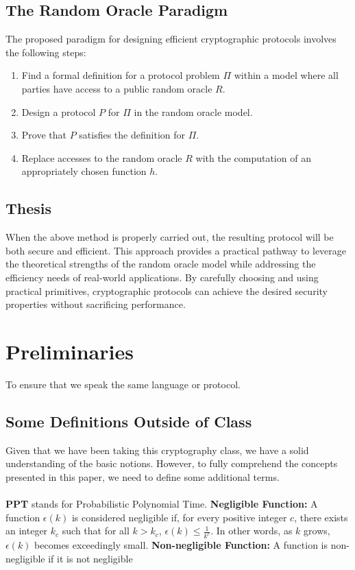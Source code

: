 \documentclass{article}
\begin{document}
\subsection{The Random Oracle Paradigm}
The proposed paradigm for designing efficient cryptographic protocols involves the following steps:

\begin{enumerate}
    \item  Find a formal definition for a protocol problem $\Pi$ within a model where all parties have access to a public random oracle $R$.
    \item  Design a protocol $P$ for $\Pi$ in the random oracle model.
    \item  Prove that $P$ satisfies the definition for $\Pi$.
    \item Replace accesses to the random oracle $R$ with the computation of an appropriately chosen function $h$.
\end{enumerate}

\subsection{Thesis}
When the above method is properly carried out, the resulting protocol will be both secure and efficient. This approach provides a practical pathway to leverage the theoretical strengths of the random oracle model while addressing the efficiency needs of real-world applications. By carefully choosing and using practical primitives, cryptographic protocols can achieve the desired security properties without sacrificing performance.
\section{Preliminaries}
To ensure that we speak the same language or protocol.
\subsection{Some Definitions Outside of Class}
Given that we have been taking this cryptography class, we have a solid understanding of the basic notions. However, to fully comprehend the concepts presented in this paper, we need to define some additional terms. 
\\
\\
\textbf{PPT} stands for Probabilistic Polynomial Time. \textbf{Negligible Function:} A function $\epsilon(k)$ is considered negligible if, for every positive integer $c$, there exists an integer $k_c$ such that for all $k > k_c$, $\epsilon(k) \leq \frac{1}{k^c}$. In other words, as $k$ grows, $\epsilon(k)$ becomes exceedingly small. \textbf{Non-negligible Function:} A function is non-negligible if it is not negligible
\end{document}
